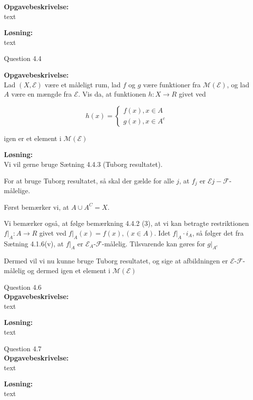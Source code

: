 \documentclass{article}
\begin{document}
\textbf{Opgavebeskrivelse:}\\
text

\vspace{15px}
\textbf{Løsning:}\\
text

\vspace{35px}
{\LARGE Question 4.4}

\textbf{Opgavebeskrivelse:}\\
Lad $(X, \mathcal{E})$ være et måleligt rum, lad $f$ og $g$ være funktioner fra $\mathcal{M(E)}$, og lad $A$ være en mængde fra $\mathcal{E}$.
Vis da, at funktionen $h: X \rightarrow R$ givet ved

\begin{equation}
    h(x) = 
    \begin{cases}
        f(x), x \in A\\
        g(x), x \in A^c
    \end{cases}
\end{equation}

igen er et element i $\mathcal{M(E)}$

\vspace{15px}
\textbf{Løsning:}\\
Vi vil gerne bruge Sætning 4.4.3 (Tuborg resultatet).

For at bruge Tuborg resultatet, så skal der gælde for alle $j$, at $f_j$ er $\mathcal{E} j-\mathcal{F}$-målelige.

Først bemærker vi, at $A \cup A^C = X$.

Vi bemærker også, at følge bemærkning 4.4.2 (3), at vi kan betragte restriktionen $f|_{A} : A \rightarrow R$ givet ved $f|_{A}(x)= f(x), (x\in A)$.
Idet $f|_{A} \cdot i_{A}$, så følger det fra Sætning 4.1.6(v), at $f|_{A}$ er $\mathcal{E}_{A}$-$\mathcal{F}$-målelig.
Tilsvarende kan gøres for $g|_{A^c}$

Dermed vil vi nu kunne bruge Tuborg resultatet, og sige at afbildningen er $\mathcal{E}$-$\mathcal{F}$-målelig og dermed igen et element i $\mathcal{M(E)}$

\vspace{35px}
{\LARGE Question 4.6}\\

\textbf{Opgavebeskrivelse:}\\
text

\vspace{15px}
\textbf{Løsning:}\\
text


\vspace{35px}
{\LARGE Question 4.7}\\

\textbf{Opgavebeskrivelse:}\\
text

\vspace{15px}
\textbf{Løsning:}\\
text
\end{document}
